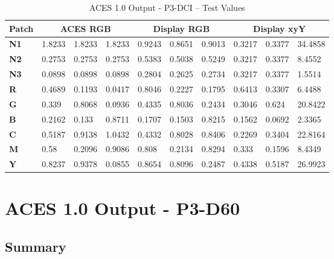 \begin{table}[ht!]
    \centering
    \begin{tabular}{|l|l|l|l|l|l|l|l|l|l|}
        \hline
        \multicolumn{1}{|c|}{\textbf{Patch}} & \multicolumn{3}{c|}{\textbf{ACES RGB}} & \multicolumn{3}{c|}{\textbf{Display RGB}} & \multicolumn{3}{c|}{\textbf{Display xyY}} \\ \hline
        \textbf{N1} & 1.8233 & 1.8233 & 1.8233 & 0.9243 & 0.8651 & 0.9013 & 0.3217 & 0.3377 & 34.4858 \\ \hline
        \textbf{N2} & 0.2753 & 0.2753 & 0.2753 & 0.5383 & 0.5038 & 0.5249 & 0.3217 & 0.3377 & 8.4552  \\ \hline
        \textbf{N3} & 0.0898 & 0.0898 & 0.0898 & 0.2804 & 0.2625 & 0.2734 & 0.3217 & 0.3377 & 1.5514  \\ \hline
        \textbf{R}  & 0.4689 & 0.1193 & 0.0417 & 0.8046 & 0.2227 & 0.1795 & 0.6413 & 0.3307 & 6.4488  \\ \hline
        \textbf{G}  & 0.339  & 0.8068 & 0.0936 & 0.4335 & 0.8036 & 0.2434 & 0.3046 & 0.624  & 20.8422 \\ \hline
        \textbf{B}  & 0.2162 & 0.133  & 0.8711 & 0.1707 & 0.1503 & 0.8215 & 0.1562 & 0.0692 & 2.3365  \\ \hline
        \textbf{C}  & 0.5187 & 0.9138 & 1.0432 & 0.4332 & 0.8028 & 0.8406 & 0.2269 & 0.3404 & 22.8164 \\ \hline
        \textbf{M}  & 0.58   & 0.2096 & 0.9086 & 0.808  & 0.2134 & 0.8294 & 0.333  & 0.1596 & 8.4349  \\ \hline
        \textbf{Y}  & 0.8237 & 0.9378 & 0.0855 & 0.8654 & 0.8096 & 0.2487 & 0.4338 & 0.5187 & 26.9923 \\ \hline
    \end{tabular}
    \caption[ACES 1.0 Output - P3-DCI -- Test Values]{\small ACES 1.0 Output - P3-DCI -- Test Values}
    \label{tab:testValues-p3dci}
\end{table}

\clearpage
\section{ACES 1.0 Output - P3-D60}
\label{sec:odt-details-p3d60}

\subsection{Summary}
\label{subsec:summary-p3d60}

